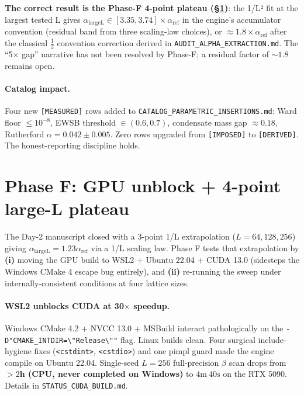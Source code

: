 \documentclass[11pt,letterpaper]{article}
\newcommand{\alphaLargeL}{\alpha_{\mathrm{largeL}}}
\begin{document}
\textbf{The correct result is the Phase-F 4-point plateau (\S\ref{sec:phasef})}:
the 1/L² fit at the largest tested L gives
$\alphaLargeL \in [3.35, 3.74] \times \alpha_{\text{ref}}$ in the
engine's accumulator convention (residual band from three scaling-law
choices), or $\approx 1.8 \times \alpha_{\text{ref}}$ after the
classical $\tfrac{1}{2}$ convention correction derived in
\texttt{AUDIT\_ALPHA\_EXTRACTION.md}. The ``5$\times$ gap'' narrative
has not been resolved by Phase-F; a residual factor of $\sim 1.8$
remains open.

\paragraph{Catalog impact.}
Four new \texttt{[MEASURED]} rows added to
\texttt{CATALOG\_PARAMETRIC\_INSERTIONS.md}: Ward floor $\le 10^{-8}$,
EWSB threshold $\in (0.6, 0.7)$, condensate mass gap $\approx 0.18$,
Rutherford $\alpha = 0.042 \pm 0.005$. Zero rows upgraded from
\texttt{[IMPOSED]} to \texttt{[DERIVED]}. The honest-reporting
discipline holds.

\section{Phase F: GPU unblock + 4-point large-L plateau}
\label{sec:phasef}

The Day-2 manuscript closed with a 3-point 1/L extrapolation
($L = 64, 128, 256$) giving $\alphaLargeL = 1.23 \alpha_{\text{ref}}$
via a 1/L scaling law. Phase F tests that extrapolation by
\textbf{(i)} moving the GPU build to WSL2 + Ubuntu 22.04 + CUDA 13.0
(sidesteps the Windows CMake 4 escape bug entirely), and
\textbf{(ii)} re-running the sweep under internally-consistent
conditions at four lattice sizes.

\paragraph{WSL2 unblocks CUDA at 30$\times$ speedup.}
Windows CMake 4.2 + NVCC 13.0 + MSBuild interact pathologically on
the \verb|-D"CMAKE_INTDIR=\"Release\""| flag. Linux builds clean. Four
surgical include-hygiene fixes (\verb|<cstdint>|, \verb|<cstdio>|) and
one pimpl guard made the engine compile on Ubuntu 22.04. Single-seed
$L=256$ full-precision $\beta$ scan drops from \textbf{$> 2$h (CPU,
never completed on Windows)} to \textbf{$4\text{m}\ 40\text{s}$} on
the RTX 5090. Details in \verb|STATUS_CUDA_BUILD.md|.
\end{document}

